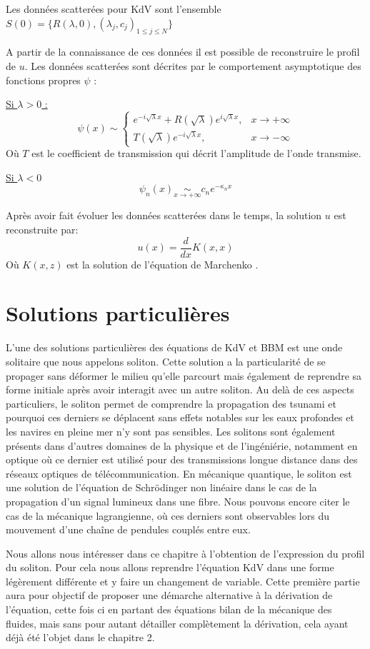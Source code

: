 Les données scatterées pour KdV sont l'ensemble $S(0) = \big\{ R(\lambda,0),(\lambda_j,c_j)_{1 \leq j \leq N}\big\}$

A partir de la connaissance de ces données il est possible de reconstruire le profil de $u$. Les données scatterées sont décrites par le comportement asymptotique des fonctions propres $\psi$ :

\underline{Si $\lambda > 0$ :} $$\psi(x) \sim \begin{cases}
    e^{-i\sqrt{\lambda}x} + R(\sqrt{\lambda})e^{i\sqrt{\lambda}x}, &x \to +\infty \\
    T(\sqrt{\lambda})e^{-i\sqrt{\lambda}x}, &x \to -\infty
\end{cases} $$
Où $T$ est le coefficient de transmission qui décrit l'amplitude de l'onde transmise.

\underline{Si $\lambda < 0$} $$\psi_n(x) \underset{x\to +\infty}{\sim} c_ne^{-\kappa_n x}$$

Après avoir fait évoluer les données scatterées dans le temps, la solution $u$ est reconstruite par:
$$u(x) = \frac{d}{dx} K(x,x)$$
Où $K(x,z)$ est la solution de l'équation de Marchenko \cite{soliton}.

\section{Solutions particulières}

L'une des solutions particulières des équations de KdV et BBM est une onde solitaire que nous appelons soliton. 
Cette solution a la particularité de se propager sans déformer le milieu qu'elle parcourt mais également de reprendre sa forme initiale après avoir interagit avec un autre soliton.
Au delà de ces aspects particuliers, le soliton permet de comprendre la propagation des tsunami et pourquoi ces derniers se déplacent sans effets notables sur les eaux profondes et les navires en pleine mer n'y sont pas sensibles. Les solitons sont également présents dans d'autres domaines de la physique et de l'ingéniérie, notamment en optique où ce dernier est utilisé pour des transmissions longue distance dans des réseaux optiques de télécommunication. En mécanique quantique, le soliton est une solution de l'équation de Schrödinger non linéaire dans le cas de la propagation d'un signal lumineux dans une fibre. Nous pouvons encore citer le cas de la mécanique lagrangienne, où ces derniers sont observables lors du mouvement d'une chaîne de pendules couplés entre eux.

Nous allons nous intéresser dans ce chapitre à l'obtention de l'expression du profil du soliton. Pour cela nous allons reprendre l'équation KdV dans une forme légèrement différente et y faire un changement de variable. Cette première partie aura pour objectif de proposer une démarche alternative à la dérivation de l'équation, cette fois ci en partant des équations bilan de la mécanique des fluides, mais sans pour autant détailler complètement la dérivation, cela ayant déjà été l'objet dans le chapitre 2.
\vspace{1em}

